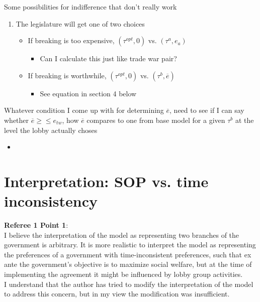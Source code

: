 \documentclass[12pt]{article}
\newcommand{\ov}{\overline}
\begin{document}
\vskip1in
Some possibilities for indifference that don't really work
\begin{enumerate}
	\item The legislature will get one of two choices
		\begin{itemize}
			\item If breaking is too expensive, $(\tau^{opt},0)$ vs. $(\tau^a,e_a)$
				\begin{itemize}
					\item Can I calculate this just like trade war pair?
				\end{itemize}
			\item If breaking is worthwhile, $(\tau^{opt},0)$ vs. $(\tau^b,\ov{e})$
				\begin{itemize}
					\item See equation in section 4 below
				\end{itemize}
		\end{itemize}
\end{enumerate}
Whatever condition I come up with for determining $\ov{e}$, need to see if I can say whether $\ov{e} \geq \leq e_{tw}$, how $\ov{e}$ compares to one from base model for a given $\tau^b$ at the level the lobby actually choses
\begin{itemize}
	\item 
\end{itemize}

\newpage
\section{Interpretation: SOP vs. time inconsistency}
\textbf{Referee 1 Point 1}: \\
I believe the interpretation of the model as representing two branches of the government is arbitrary. It is more realistic to interpret the model as representing the preferences of a government with time-inconsistent preferences, such that ex ante the government's objective is to maximize social welfare, but at the time of implementing the agreement it might be influenced by lobby group activities. \\

I understand that the author has tried to modify the interpretation of the model to address this concern, but in my view the modification was insufficient. \\
\end{document}
